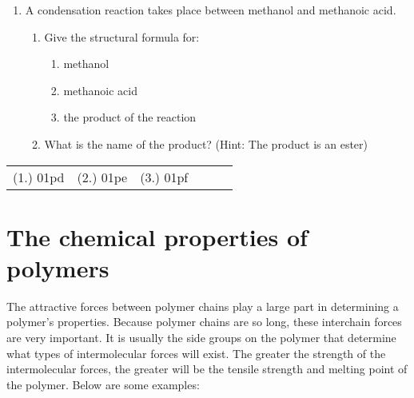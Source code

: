 {\begin{enumerate}
{	\begin{enumerate}
	\item{Give the structural formula of the monomer in this polymer.}
	\item{What is the name of the monomer?}
	\item{Draw the abbreviated structural formula for the polymer.}
	\item{Has this polymer been formed through an addition or condensation polymerisation reaction?}
	\end{enumerate}

}

\item{A condensation reaction takes place between methanol and methanoic acid.}
	\begin{enumerate}
	\item{Give the structural formula for:}
		\begin{enumerate}
		\item{methanol}	
		\item{methanoic acid}
		\item{the product of the reaction}
		\end{enumerate}
	\item{What is the name of the product? (Hint: The product is an ester)}
	\end{enumerate}

\end{enumerate}

\par \practiceinfo
\par \begin{tabular}[h]{cccccc}
(1.)	01pd	&
(2.)	01pe	&
(3.)	01pf	&
\end{tabular}
}






\section{The chemical properties of polymers}
\label{subsec:orgmac:properties}

The attractive forces between polymer chains play a large part in determining a polymer's properties. Because polymer chains are so long, these interchain forces are very important. It is usually the side groups on the polymer that determine what types of intermolecular forces will exist. The greater the strength of the intermolecular forces, the greater will be the tensile strength and melting point of the polymer. Below are some examples:

